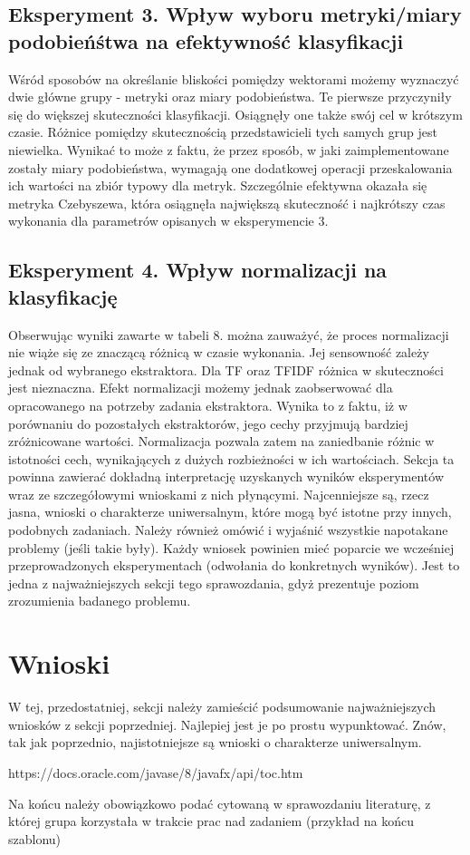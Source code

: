 \documentclass{classrep}
\begin{document}
\subsection{Eksperyment 3. Wpływ wyboru metryki/miary podobieńśtwa na efektywność klasyfikacji}
Wśród sposobów na określanie bliskości pomiędzy wektorami możemy wyznaczyć dwie główne grupy - metryki oraz miary podobieństwa. Te pierwsze przyczyniły się do większej skuteczności klasyfikacji. Osiągnęły one także swój cel w krótszym czasie. Różnice pomiędzy skutecznością przedstawicieli tych samych grup jest niewielka. Wynikać to może z faktu, że przez sposób, w jaki zaimplementowane zostały miary podobieństwa, wymagają one dodatkowej operacji przeskalowania ich wartości na zbiór typowy dla metryk. Szczególnie efektywna okazała się metryka Czebyszewa, która osiągnęła największą skuteczność i najkrótszy czas wykonania dla parametrów opisanych w eksperymencie 3. 
\subsection{Eksperyment 4. Wpływ normalizacji na klasyfikację}
Obserwując wyniki zawarte w tabeli 8. można zauważyć, że proces normalizacji nie wiąże się ze znaczącą różnicą w czasie wykonania. Jej sensowność zależy jednak od wybranego ekstraktora. Dla TF oraz TFIDF różnica w skuteczności jest nieznaczna. Efekt normalizacji możemy jednak zaobserwować dla opracowanego na potrzeby zadania ekstraktora. Wynika to z faktu, iż w porównaniu do pozostałych ekstraktorów, jego cechy przyjmują bardziej zróżnicowane wartości. Normalizacja pozwala zatem na zaniedbanie różnic w istotności cech, wynikających z dużych rozbieżności w ich wartościach.
{\color{blue}
Sekcja ta powinna zawierać dokładną interpretację uzyskanych wyników
eksperymentów wraz ze szczegółowymi wnioskami z nich płynącymi. Najcenniejsze
są, rzecz jasna, wnioski o charakterze uniwersalnym, które mogą być istotne
przy innych, podobnych zadaniach. Należy również omówić i wyjaśnić wszystkie
napotakane problemy (jeśli takie były). Każdy wniosek powinien mieć poparcie
we wcześniej przeprowadzonych eksperymentach (odwołania do konkretnych
wyników). Jest to jedna z najważniejszych sekcji tego sprawozdania, gdyż
prezentuje poziom zrozumienia badanego problemu.}
\section{Wnioski}
{\color{blue}W tej, przedostatniej, sekcji należy zamieścić podsumowanie
najważniejszych wniosków z sekcji poprzedniej. Najlepiej jest je po prostu
wypunktować. Znów, tak jak poprzednio, najistotniejsze są wnioski o
charakterze uniwersalnym.}


\begin{thebibliography}{0}

https://docs.oracle.com/javase/8/javafx/api/toc.htm

\end{thebibliography}
{\color{blue} 
Na końcu należy obowiązkowo podać cytowaną w sprawozdaniu
literaturę, z której grupa korzystała w trakcie prac nad zadaniem (przykład na
końcu szablonu)}
\end{document}

